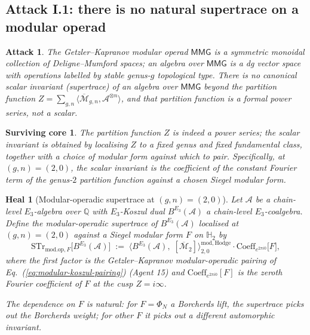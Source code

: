 \documentclass[11pt]{amsart}
\newtheorem{attack}[theorem]{Attack}
\newtheorem{surviving}[theorem]{Surviving core}
\newtheorem{heal}[theorem]{Heal}
\providecommand{\Q}{\mathbb{Q}}
\providecommand{\cA}{\mathcal{A}}
\providecommand{\Mbar}{\overline{\mathcal{M}}}
\providecommand{\STr}{\mathrm{STr}}
\providecommand{\modop}{\mathrm{mod.op}}
\begin{document}
\subsection{Attack I.1: there is no natural supertrace on a modular
operad}

\begin{attack}
\label{att:no-natural-supertrace}
The Getzler--Kapranov modular operad $\mathsf{MMG}$ is a symmetric
monoidal collection of Deligne--Mumford spaces; an algebra over
$\mathsf{MMG}$ is a dg vector space with operations labelled by
stable genus-$g$ topological type. There is no canonical scalar
invariant (supertrace) of an algebra over $\mathsf{MMG}$ beyond the
partition function $Z = \sum_{g, n} \langle \Mbar_{g, n}, \cA^{\otimes
n}\rangle$, and that partition function is a formal power series, not
a scalar.
\end{attack}

\begin{surviving}
\label{surv:localised-supertrace}
The partition function $Z$ is indeed a power series; the scalar
invariant is obtained by localising $Z$ to a fixed genus and fixed
fundamental class, together with a choice of modular form against
which to pair. Specifically, at $(g, n) = (2, 0)$, the scalar
invariant is the coefficient of the constant Fourier term of the
genus-$2$ partition function against a chosen Siegel modular form.
\end{surviving}

\begin{heal}[Modular-operadic supertrace at $(g, n) = (2, 0)$]
\label{heal:mod-op-supertrace}
Let $\cA$ be a chain-level $E_3$-algebra over $\Q$ with $E_3$-Koszul
dual $B^{E_3}(\cA)$ a chain-level $E_3$-coalgebra. Define the
\emph{modular-operadic supertrace} of $B^{E_3}(\cA)$ localised at
$(g, n) = (2, 0)$ against a Siegel modular form $F$ on
$\mathbb{H}_2$ by
\begin{equation}
\label{eq:mod-op-supertrace-defn}
 \STr_{\modop, F}\bigl[B^{E_3}(\cA)\bigr] \;:=\;
 \bigl\langle
   B^{E_3}(\cA),\;
   [\Mbar_2]
 \bigr\rangle^{\mathrm{mod, Hodge}}_{2, 0} \cdot
 \mathrm{Coeff}_{e^{2\pi i 0}}\!\bigl[F\bigr],
\end{equation}
where the first factor is the Getzler--Kapranov modular-operadic
pairing of Eq.~(\ref{eq:modular-koszul-pairing}) (Agent 15) and
$\mathrm{Coeff}_{e^{2\pi i 0}}[F]$ is the zeroth Fourier coefficient
of $F$ at the cusp $Z = i \infty$.

The dependence on $F$ is natural: for $F = \Phi_N$ a Borcherds lift,
the supertrace picks out the Borcherds weight; for other $F$ it picks
out a different automorphic invariant.
\end{heal}
\end{document}
